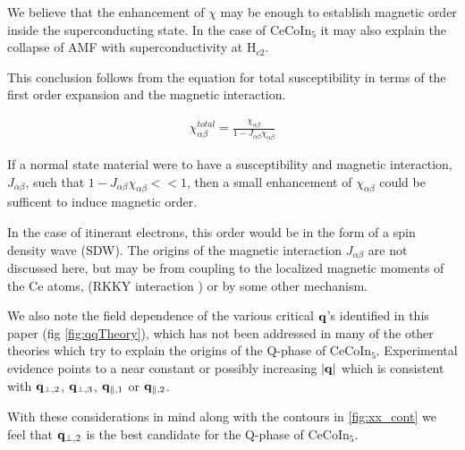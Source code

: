 \documentclass[prb,showpacs,amssymb,amsmath,twocolumn]{revtex4-1}
\begin{document}
We believe that the enhancement of $\chi$ may be enough to establish magnetic
order inside the superconducting state. In the case of CeCoIn$_5$ it may also
explain the collapse of AMF with superconductivity at H$_{c2}$. 

This conclusion follows from the equation for total susceptibility in terms of the first order
expansion and the magnetic interaction. 

\begin{align}
\chi^{total}_{\alpha\beta}=\frac{\chi_{\alpha\beta}}{1-J_{\alpha\beta} \chi_{\alpha\beta}}
\end{align}

If a normal state material were to have a susceptibility and magnetic interaction, $J_{\alpha\beta}$, such that
$1-J_{\alpha\beta} \chi_{\alpha\beta}<<1$, then a small enhancement of
$\chi_{\alpha\beta}$ could be sufficent to induce magnetic order. 

In the case of itinerant electrons, this order would be in the form of a spin density wave
(SDW). The origins of the magnetic interaction $J_{\alpha\beta}$ are not
discussed here, but may be from coupling to the localized magnetic moments of
the Ce atoms, (RKKY interaction \cite{x}) or by some other mechanism.

We also note the field dependence of the various critical ${\bf q}$'s identified in this paper (fig \ref{fig:qqTheory}), which has not been addressed in many of the other theories which try to explain the origins of the Q-phase of CeCoIn$_5$. Experimental evidence points to a near constant or possibly increasing $|{\bf q}|$ which is consistent with ${\bf q}_{\perp,2}$, ${\bf q}_{\perp,3}$, ${\bf q}_{\parallel,1}$ or ${\bf q}_{\parallel,2}$. \cite{sc_sdw_anton,mag_afm_fflo_sigrist,fflo_pen_depth,sc_afm_kato,sc_afm_ikeda,sdw_vortex, cecoin5_Kenzelmann2}

With these considerations in mind along with the contours in \ref{fig:xx_cont} we feel that ${\bf q}_{\perp,2}$ is the best candidate for the Q-phase of CeCoIn$_5$.



\end{document}
